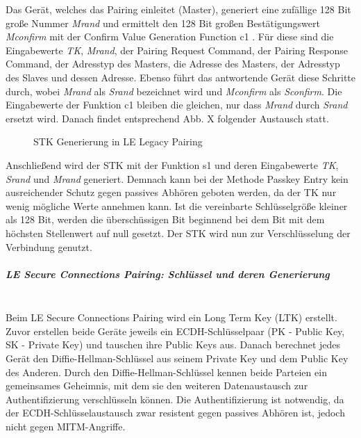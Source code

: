 Das Gerät, welches das Pairing einleitet (Master), generiert eine zufällige 128 Bit große Nummer \textit{Mrand} und ermittelt den 128 Bit großen Bestätigungswert \textit{Mconfirm} mit der Confirm Value Generation Function c1 \cite{BtSpec4.2_2288}. 
Für diese sind die Eingabewerte \textit{TK}, \textit{Mrand}, der Pairing Request Command, der Pairing Response Command, der Adresstyp des Masters, die Adresse des Masters, der Adresstyp des Slaves und dessen Adresse. Ebenso führt das antwortende Gerät diese Schritte durch, wobei \textit{Mrand} als \textit{Srand} bezeichnet wird und \textit{Mconfirm} als \textit{Sconfirm}. Die Eingabewerte der Funktion c1 bleiben die gleichen, nur dass \textit{Mrand} durch \textit{Srand} ersetzt wird. Danach findet entsprechend Abb. X folgender Austausch statt.
\begin{figure}[hbt!]
    \centering
    \caption{STK Generierung in LE Legacy Pairing}
\end{figure}

Anschließend wird der STK mit der Funktion s1 \cite{BtSpec4.2_2290}
und deren Eingabewerte \textit{TK}, \textit{Srand} und \textit{Mrand} generiert. Demnach kann bei der Methode Passkey Entry kein ausreichender Schutz gegen passives Abhören geboten werden, da der TK nur wenig mögliche Werte annehmen kann. Ist die vereinbarte Schlüsselgröße kleiner als 128 Bit, werden die überschüssigen Bit beginnend bei dem Bit mit dem höchsten Stellenwert auf null gesetzt. Der STK wird nun zur Verschlüsselung der Verbindung genutzt. \cite{BtSpec4.2_2305-2306}


\subparagraph{LE Secure Connections Pairing: Schlüssel und deren Generierung} \mbox{} \vspace{0.2cm} \\

Beim LE Secure Connections Pairing wird ein Long Term Key (LTK) erstellt. Zuvor erstellen beide Geräte jeweils ein ECDH-Schlüsselpaar (PK - Public Key, SK - Private Key) und tauschen ihre Public Keys aus. Danach berechnet jedes Gerät den Diffie-Hellman-Schlüssel aus seinem Private Key und dem Public Key des Anderen. Durch den Diffie-Hellman-Schlüssel kennen beide Parteien ein gemeinsames Geheimnis, mit dem sie den weiteren Datenaustausch zur Authentifizierung verschlüsseln können. Die Authentifizierung ist notwendig, da der ECDH-Schlüsselaustausch zwar resistent gegen passives Abhören ist, jedoch nicht gegen MITM-Angriffe. \cite{BtSpec4.2_2307}

